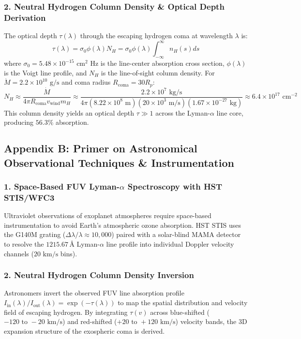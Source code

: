 \documentclass[11pt,a4paper]{article}
\begin{document}
\subsubsection*{2. Neutral Hydrogen Column Density \& Optical Depth Derivation}
The optical depth $\tau(\lambda)$ through the escaping hydrogen coma at wavelength $\lambda$ is:
\begin{equation}
\tau(\lambda) = \sigma_0 \phi(\lambda) N_H = \sigma_0 \phi(\lambda) \int_{-\infty}^{\infty} n_H(s) ds
\end{equation}
where $\sigma_0 = 5.48 \times 10^{-15}\text{ cm}^2\text{ Hz}$ is the line-center absorption cross section, $\phi(\lambda)$ is the Voigt line profile, and $N_H$ is the line-of-sight column density.
For $\dot{M} = 2.2 \times 10^{10}\text{ g/s}$ and coma radius $R_{\text{coma}} = 30 R_p$:
\begin{equation}
N_H \approx \frac{\dot{M}}{4\pi R_{\text{coma}} v_{\text{wind}} m_H} \approx \frac{2.2 \times 10^7\text{ kg/s}}{4\pi (8.22 \times 10^8\text{ m}) (20 \times 10^3\text{ m/s}) (1.67 \times 10^{-27}\text{ kg})} \approx 6.4 \times 10^{17}\text{ cm}^{-2}
\end{equation}
This column density yields an optical depth $\tau \gg 1$ across the Lyman-$\alpha$ line core, producing $56.3\%$ absorption.

\subsection*{Appendix B: Primer on Astronomical Observational Techniques \& Instrumentation}

\subsubsection*{1. Space-Based FUV Lyman-$\alpha$ Spectroscopy with HST STIS/WFC3}
Ultraviolet observations of exoplanet atmospheres require space-based instrumentation to avoid Earth's atmospheric ozone absorption. HST STIS uses the G140M grating ($\Delta \lambda / \lambda \approx 10,000$) paired with a solar-blind MAMA detector to resolve the $1215.67\,\text{\AA}$ Lyman-$\alpha$ line profile into individual Doppler velocity channels ($20\text{ km/s}$ bins).

\subsubsection*{2. Neutral Hydrogen Column Density Inversion}
Astronomers invert the observed FUV line absorption profile $I_{\text{in}}(\lambda) / I_{\text{out}}(\lambda) = \exp(-\tau(\lambda))$ to map the spatial distribution and velocity field of escaping hydrogen. By integrating $\tau(v)$ across blue-shifted ($-120\text{ to }-20\text{ km/s}$) and red-shifted ($+20\text{ to }+120\text{ km/s}$) velocity bands, the 3D expansion structure of the exospheric coma is derived.
\end{document}
